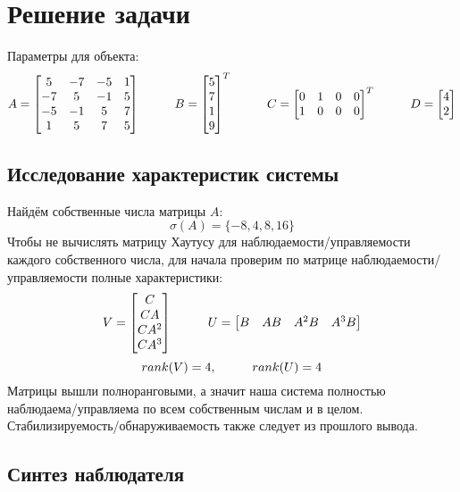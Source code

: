 \section{Решение задачи}

Параметры для объекта:
$$
  A = \begin{bmatrix}
    5 & -7 & -5 & 1 \\
    -7 & 5 & -1 & 5 \\
    -5 & -1 & 5 & 7 \\
    1 & 5 & 7 & 5
  \end{bmatrix} \hspace*{1cm}
  B = \begin{bmatrix}
    5\\7\\1\\9
  \end{bmatrix}^T \hspace*{1cm}
  C = \begin{bmatrix}
    0 & 1 & 0 & 0 \\
    1 & 0 & 0 & 0 
  \end{bmatrix}^T \hspace*{1cm}
  D = \begin{bmatrix}
    4\\2
  \end{bmatrix} 
$$

\subsection{Исследование характеристик системы}
Найдём собственные числа матрицы $A$:
$$
    \sigma(A) = \{-8, 4, 8, 16\}
$$
Чтобы не вычислять матрицу Хаутусу для наблюдаемости/управляемости каждого собственного числа, для начала проверим по матрице наблюдаемости/управляемости полные характеристики:
$$
  V = \begin{bmatrix}
    C \\
    CA \\
    CA^2 \\
    CA^3
  \end{bmatrix} \hspace*{1cm} 
  U = \begin{bmatrix}
    B & AB & A^2B & A^3B 
  \end{bmatrix}
$$
$$
  rank(V) = 4, \hspace*{1cm} rank(U) = 4
$$
Матрицы вышли полноранговыми, а значит наша система полностью наблюдаема/управляема по всем собственным числам и в целом. 
Стабилизируемость/обнаруживаемость также следует из прошлого вывода.

\subsection{Синтез наблюдателя}


